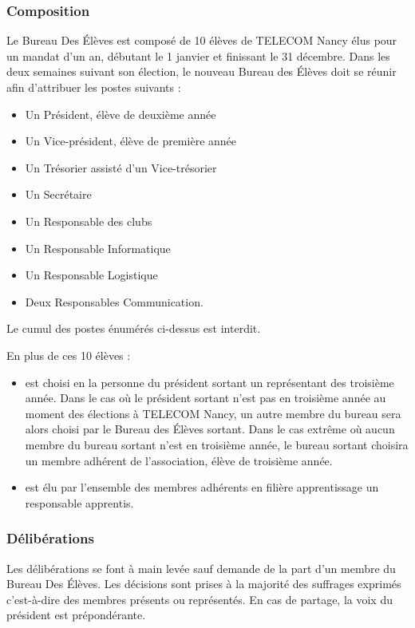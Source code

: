 \documentclass{article} %
\begin{document}
			\subsubsection{Composition}
				Le Bureau Des Élèves est composé de 10 élèves de TELECOM Nancy élus
				pour un mandat d’un an, débutant le 1 janvier et finissant le
				31 décembre. Dans les deux semaines suivant son élection, le nouveau
				Bureau des Élèves doit se réunir afin d'attribuer les postes suivants
				:
				\begin{itemize}
					\item Un Président, élève de deuxième année
					\item Un Vice-président, élève de première année
					\item Un Trésorier assisté d’un Vice-trésorier
					\item Un Secrétaire
					\item Un Responsable des clubs
					\item Un Responsable Informatique
					\item Un Responsable Logistique
					\item Deux Responsables Communication.
				\end{itemize}
				
				Le cumul des postes énumérés ci-dessus est interdit.

				En plus de ces 10 élèves :
				\begin{itemize}
					\item est choisi en la personne du président sortant un
					    représentant des troisième année. Dans le cas où le président
					    sortant n’est pas en troisième année au moment des élections
					    à TELECOM Nancy, un autre membre du bureau sera alors choisi
					    par le Bureau des Élèves sortant. Dans le cas extrême où
					    aucun membre du bureau sortant n’est en troisième année, le
					    bureau sortant choisira un membre adhérent de l'association,
					    élève de troisième année.
					\item est élu par l’ensemble des membres adhérents en filière
					    apprentissage un responsable apprentis.
				\end{itemize}

			\subsubsection{Délibérations}
				Les délibérations se font à main levée sauf demande de la part d’un
				membre du Bureau Des Élèves. Les décisions sont prises à la majorité
				des	suffrages exprimés c’est-à-dire des membres présents ou
				représentés. En cas de partage, la voix du président est
				prépondérante.
\end{document}
